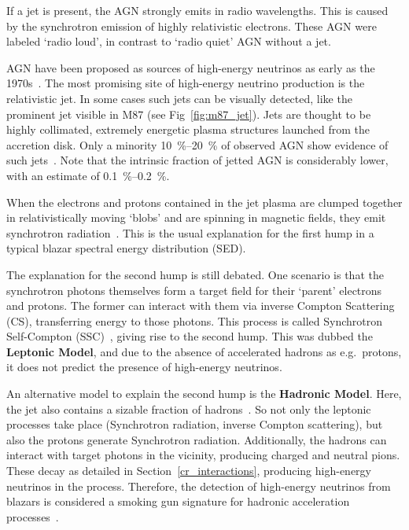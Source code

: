 If a jet is present, the AGN strongly emits in radio wavelengths. This is caused by the synchrotron emission of highly relativistic electrons. These AGN were labeled `radio loud', in contrast to `radio quiet' AGN without a jet.

AGN have been proposed as sources of high-energy neutrinos as early as the 1970s~. The most promising site of high-energy neutrino production is the relativistic jet. In some cases such jets can be visually detected, like the prominent jet visible in M87 (see Fig~\ref{fig:m87_jet}). Jets are thought to be highly collimated, extremely energetic plasma structures launched from the accretion disk. Only a minority \SIrange{10}{20}{\percent} of observed AGN show evidence of such jets~. Note that the intrinsic fraction of jetted AGN is considerably lower, with an estimate of \SIrange{0.1}{0.2}{\percent}.

When the electrons and protons contained in the jet plasma are clumped together in relativistically moving `blobs' and are spinning in magnetic fields, they emit synchrotron radiation~. This is the usual explanation for the first hump in a typical blazar spectral energy distribution (SED).

The explanation for the second hump is still debated. One scenario is that the synchrotron photons themselves form a target field for their `parent' electrons and protons. The former can interact with them via inverse Compton Scattering (CS), transferring energy to those photons. This process is called Synchrotron Self-Compton (SSC)~\cite{Spurio2018}, giving rise to the second hump. This was dubbed the \textbf{Leptonic Model}, and due to the absence of accelerated hadrons as e.g.\ protons, it does not predict the presence of high-energy neutrinos.

An alternative model to explain the second hump is the \textbf{Hadronic Model}. Here, the jet also contains a sizable fraction of hadrons~. So not only the leptonic processes take place (Synchrotron radiation, inverse Compton scattering), but also the protons generate Synchrotron radiation. Additionally, the hadrons can interact with target photons in the vicinity, producing charged and neutral pions. These decay as detailed in Section~\ref{cr_interactions}, producing high-energy neutrinos in the process. Therefore, the detection of high-energy neutrinos from blazars is considered a smoking gun signature for hadronic acceleration processes~.

